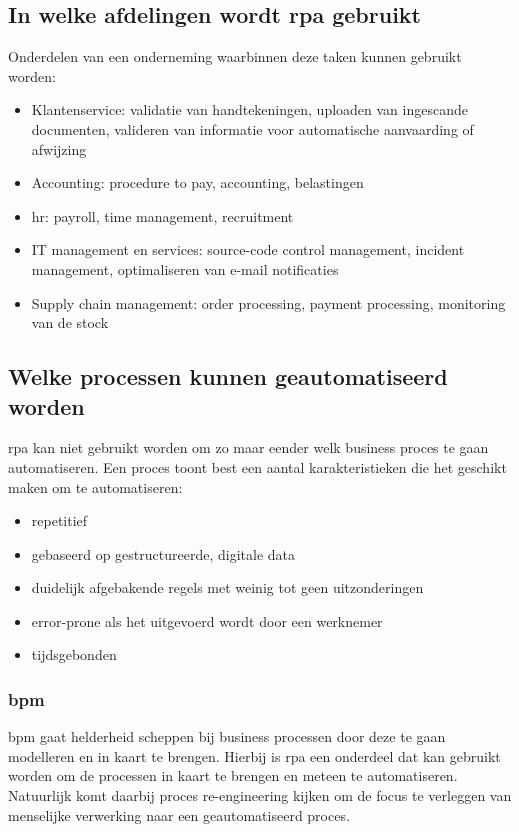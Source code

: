 \subsection{In welke afdelingen wordt \acrshort{rpa} gebruikt}
Onderdelen van een onderneming waarbinnen deze taken kunnen gebruikt worden:
\begin{itemize}
	\item Klantenservice: validatie van handtekeningen, uploaden van ingescande documenten, valideren van informatie voor automatische aanvaarding of afwijzing
	\item Accounting: procedure to pay, accounting, belastingen
	\item \acrfull{hr}: payroll, time management, recruitment
	\item IT management en services: source-code control management, incident management, optimaliseren van e-mail notificaties
	\item Supply chain management: order processing, payment processing, monitoring van de stock
\end{itemize}
\autocite{everythingRPA}

\subsection{Welke processen kunnen geautomatiseerd worden}
\acrshort{rpa} kan niet gebruikt worden om zo maar eender welk business proces te gaan automatiseren. Een proces toont best een aantal karakteristieken die het geschikt maken om te automatiseren:
\begin{itemize}
	\item repetitief
	\item gebaseerd op gestructureerde, digitale data
	\item duidelijk afgebakende regels met weinig tot geen uitzonderingen
	\item error-prone als het uitgevoerd wordt door een werknemer
	\item tijdsgebonden
\end{itemize}

\subsubsection{\acrlong{bpm}}
\acrfull{bpm} gaat helderheid scheppen bij business processen door deze te gaan modelleren en in kaart te brengen. Hierbij is \acrshort{rpa} een onderdeel dat kan gebruikt worden om de processen in kaart te brengen en meteen te automatiseren. Natuurlijk komt daarbij proces re-engineering kijken om de focus te verleggen van menselijke verwerking naar een geautomatiseerd proces.

